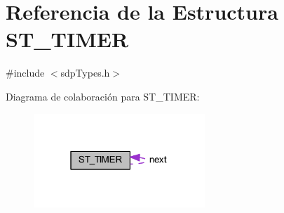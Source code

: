 \hypertarget{struct_s_t___t_i_m_e_r}{}\section{Referencia de la Estructura S\+T\+\_\+\+T\+I\+M\+E\+R}
\label{struct_s_t___t_i_m_e_r}


{\ttfamily \#include $<$sdp\+Types.\+h$>$}



Diagrama de colaboración para S\+T\+\_\+\+T\+I\+M\+E\+R\+:\nopagebreak
\begin{figure}[H]
\begin{center}
\leavevmode
\includegraphics[width=183pt]{struct_s_t___t_i_m_e_r__coll__graph}
\end{center}
\end{figure}
